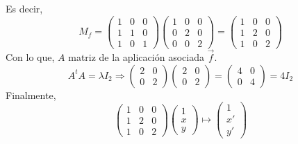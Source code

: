 \documentclass[10pt,a4paper,openright]{book}
\theoremstyle{break}
\begin{document}
Es decir,
\[
    M_f = \begin{pmatrix} 1 & 0 & 0\\ 1 & 1 & 0\\ 1 & 0 & 1 \end{pmatrix} \begin{pmatrix} 1 & 0 & 0\\ 0 & 2 & 0\\ 0 & 0 & 2 \end{pmatrix} = \begin{pmatrix} 1 & 0 & 0\\ 1 & 2 & 0\\ 1 & 0 & 2 \end{pmatrix}
\]
Con lo que, $A$ matriz de la aplicación asociada $\overrightarrow{f}$. 
\[
    A^tA = \lambda I_2 \Rightarrow \begin{pmatrix} 2 & 0\\ 0 & 2 \end{pmatrix} \begin{pmatrix} 2 & 0\\ 0 & 2 \end{pmatrix} = \begin{pmatrix} 4 & 0\\ 0 & 4 \end{pmatrix} = 4I_2
\]
Finalmente, 
\[
    \begin{pmatrix} 1 & 0 & 0\\ 1 & 2 & 0\\ 1 & 0 & 2 \end{pmatrix} \begin{pmatrix} 1\\ x\\ y \end{pmatrix} \mapsto \begin{pmatrix} 1\\ x'\\ y' \end{pmatrix} 
\]
\end{document}
